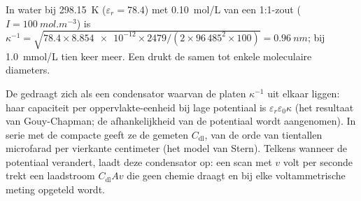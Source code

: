 \begin{example}\label{ex:b3:electrode-kinetics:debye}
In water bij \qty{298.15}{K} ($\varepsilon_r = 78.4$) met
\qty{0.10}{mol/L} van een 1:1-zout ($I = \qty{100}{mol.m^{-3}}$) is
$\kappa^{-1} = \sqrt{78.4 \times \num{8.854e-12} \times 2479/(2 \times 96\,485^2 \times 100)} = \qty{0.96}{nm}$; bij \qty{1.0}{mmol/L}
tien keer meer. Een  drukt de  samen tot enkele
moleculaire diameters.
\end{example}

De  gedraagt zich als een condensator waarvan de platen
$\kappa^{-1}$ uit elkaar liggen: haar capaciteit per oppervlakte-eenheid
bij lage potentiaal is $\varepsilon_r\varepsilon_0\kappa$ (het resultaat
van Gouy-Chapman; de afhankelijkheid van de potentiaal wordt aangenomen).
In serie met de compacte  geeft ze de gemeten $C_{\mathrm{dl}}$, van de orde van tientallen
microfarad per vierkante centimeter (het model van Stern). Telkens wanneer
de potentiaal verandert, laadt deze condensator op: een scan met $v$ volt
per seconde trekt een laadstroom $C_{\mathrm{dl}}Av$ die geen chemie
draagt en bij elke voltammetrische meting opgeteld wordt.

